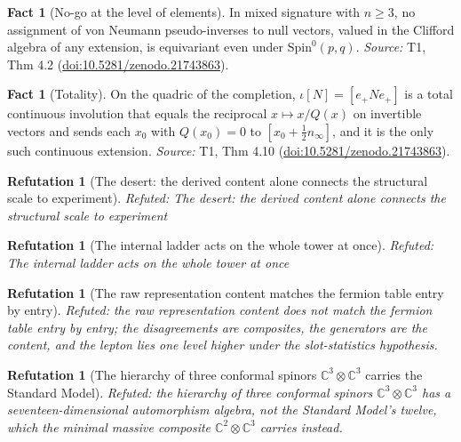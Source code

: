 \documentclass[11pt]{article}
\newtheorem{refutation}[theorem]{Refutation}
\theoremstyle{definition}
\newtheorem{fact}[theorem]{Fact}
\theoremstyle{plain}
\providecommand{\C}{}\renewcommand{\C}{\mathbb{C}}
\providecommand{\Spin}{}\renewcommand{\Spin}{\mathrm{Spin}}
\providecommand{\nInf}{}\renewcommand{\nInf}{n_\infty}
\begin{document}
\begin{fact}[No-go at the level of elements]\label{c:transport.no-go-level-elements}
In mixed signature with $n \geq 3$, no assignment of von Neumann pseudo-inverses to null vectors, valued in the Clifford algebra of any extension, is equivariant even under $\Spin^0(p,q)$.
\emph{Source:} T1, Thm 4.2 (\href{https://doi.org/10.5281/zenodo.21743863}{doi:10.5281/zenodo.21743863}).
\end{fact}

\begin{fact}[Totality]\label{c:transport.totality}
On the quadric of the completion, $\iota[N] = [e_+ N e_+]$ is a total continuous involution that equals the reciprocal $x \mapsto x/Q(x)$ on invertible vectors and sends each $x_0$ with $Q(x_0) = 0$ to $[x_0 + \frac12 \nInf]$, and it is the only such continuous extension.
\emph{Source:} T1, Thm 4.10 (\href{https://doi.org/10.5281/zenodo.21743863}{doi:10.5281/zenodo.21743863}).
\end{fact}

\begin{refutation}[The desert: the derived content alone connects the structural scale to experiment]\label{c:refuted.the-desert-the-derived-content-alone-connects-th}
Refuted: The desert: the derived content alone connects the structural scale to experiment
\end{refutation}

\begin{refutation}[The internal ladder acts on the whole tower at once]\label{c:refuted.the-internal-ladder-acts-on-the-whole-tower-at-o}
Refuted: The internal ladder acts on the whole tower at once
\end{refutation}

\begin{refutation}[The raw representation content matches the fermion table entry by entry]\label{c:refuted.the-raw-representation-content-matches-the-fermi}
Refuted: the raw representation content does not match the fermion table entry by entry; the disagreements are composites, the generators are the content, and the lepton lies one level higher under the slot-statistics hypothesis.
\end{refutation}

\begin{refutation}[The hierarchy of three conformal spinors $\mathbb{C}^{3}\otimes\mathbb{C}^{3}$ carries the Standard Model]\label{c:refuted.the-three-twistor-hierarchy-carries-the-standard}
Refuted: the hierarchy of three conformal spinors $\C^{3}\otimes\C^{3}$ has a seventeen-dimensional automorphism algebra, not the Standard Model's twelve, which the minimal massive composite $\C^{2}\otimes\C^{3}$ carries instead.
\end{refutation}
\end{document}
